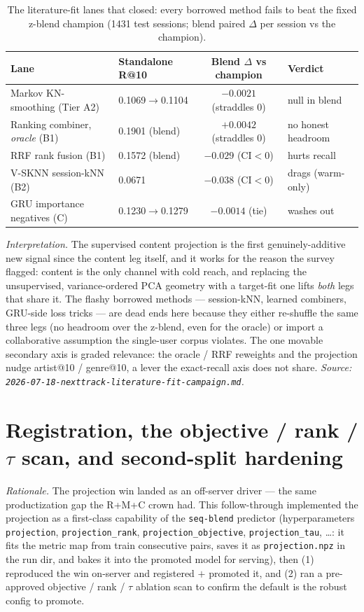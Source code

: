 \documentclass[11pt]{article}
\begin{document}
\begin{table}[ht]
  \centering
  \caption{The literature-fit lanes that closed: every borrowed method fails to
  beat the fixed z-blend champion (\num{1431} test sessions; blend paired $\Delta$
  per session vs the champion).}
  \label{tab:projection-lanes}
  {\footnotesize\setlength{\tabcolsep}{5pt}\begin{tabular}{llcl}
    \toprule
    Lane & Standalone R@10 & Blend $\Delta$ vs champion & Verdict \\
    \midrule
    Markov KN-smoothing (Tier A2)         & 0.1069$\to$0.1104 & $-0.0021$ (straddles 0) & null in blend \\
    Ranking combiner, \emph{oracle} (B1)  & 0.1901 (blend) & $+0.0042$ (straddles 0) & no honest headroom \\
    RRF rank fusion (B1)                   & 0.1572 (blend) & $-0.029$ (CI$<$0) & hurts recall \\
    V-SKNN session-kNN (B2)                & 0.0671 & $-0.038$ (CI$<$0) & drags (warm-only) \\
    GRU importance negatives (C)           & 0.1230$\to$0.1279 & $-0.0014$ (tie) & washes out \\
    \bottomrule
  \end{tabular}}
\end{table}

\emph{Interpretation.} The supervised content projection is the first
genuinely-additive new signal since the content leg itself, and it works for the
reason the survey flagged: content is the only channel with cold reach, and
replacing the unsupervised, variance-ordered PCA geometry with a target-fit one
lifts \emph{both} legs that share it. The flashy borrowed methods --- session-kNN,
learned combiners, GRU-side loss tricks --- are dead ends here because they either
re-shuffle the same three legs (no headroom over the z-blend, even for the oracle)
or import a collaborative assumption the single-user corpus violates. The one
movable secondary axis is graded relevance: the oracle / RRF reweights and the
projection nudge artist@10 / genre@10, a lever the exact-recall axis does not
share.
\emph{Source: \texttt{2026-07-18-nexttrack-literature-fit-campaign.md}.}

\section{Registration, the objective / rank / $\tau$ scan, and second-split hardening}
\label{sec:projection-scan}
\emph{Rationale.} The projection win landed as an off-server driver --- the same
productization gap the R+M+C crown had. This follow-through implemented the
projection as a first-class capability of the \texttt{seq-blend} predictor
(hyperparameters \texttt{projection}, \texttt{projection\_rank},
\texttt{projection\_objective}, \texttt{projection\_tau}, \dots: it fits the metric
map from train consecutive pairs, saves it as \texttt{projection.npz} in the run
dir, and bakes it into the promoted model for serving), then (1) reproduced the
win on-server and registered $+$ promoted it, and (2) ran a pre-approved objective
/ rank / $\tau$ ablation scan to confirm the default is the robust config to
promote.
\end{document}
